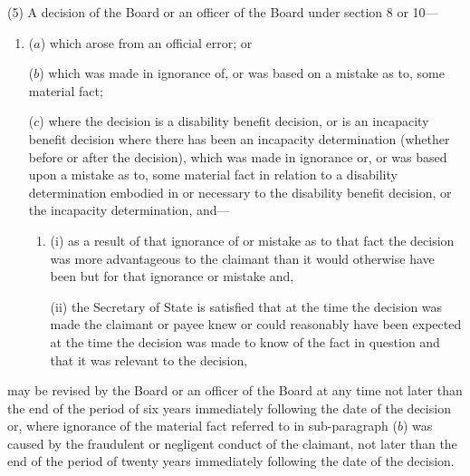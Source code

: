 \documentclass[12pt,a4paper]{article}
\begin{document}
(5) A decision of the 
Board or an officer of the Board  %
under section 8 or 10—
\begin{enumerate}\item[]
($a$) which arose from an official error; or


($b$) which was made in ignorance of, or was based on a mistake as to, some material 
fact;

($c$) where the decision is a disability benefit decision, or is an incapacity benefit decision where there has been an incapacity determination (whether before or after the decision), which was made in ignorance or, or was based upon a mistake as to, some material fact in relation to a disability determination embodied in or necessary to the disability benefit decision, or the incapacity determination, and---
\begin{enumerate}\item[]
(i) as a result of that ignorance of or mistake as to that fact the decision was more advantageous to the claimant than it would otherwise have been but for that ignorance or mistake and,

(ii) the Secretary of State is satisfied that at the time the decision was made the claimant or payee knew or could reasonably have been expected at the time the decision was made to know of the fact in question and that it was relevant to the decision,
\end{enumerate}
\end{enumerate}
may be revised 
by the Board or an officer of the Board at any time not later than the end of the period of six years immediately following the date of the decision or, where ignorance of the material fact referred to in sub-paragraph ($b$)  was caused by the fraudulent or negligent conduct of the claimant, not later than the end of the period of twenty years immediately following the date of the decision.  %
\end{document}
